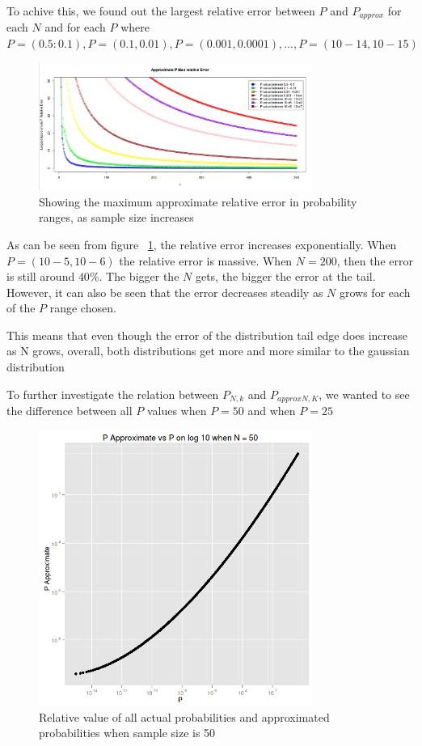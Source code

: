 \documentclass[12pt]{article}
\begin{document}
To achive this, we found out the largest relative error between $P$ and $P_{approx}$ for each $N$ and for each $P$ where $P = (0.5:0.1), P = (0.1, 0.01), P = (0.001, 0.0001), ... , P = (10-14 , 10-15)$

\begin{figure}
	\centering
  \includegraphics[width=0.8\textwidth]{LargestApproxPRelativeError3}
	\caption{Showing the maximum approximate relative error in probability ranges, as sample size increases}
	\label{fig:LargestApproxPRelativeError}
\end{figure}

As can be seen from figure ~\ref{fig:LargestApproxPRelativeError}, the relative error increases exponentially. When $P = (10-5 , 10-6)$ the relative error is massive. When $N=200$, then the error is still around $40\%$. The bigger the $N$ gets, the bigger the error at the tail. However, it can also be seen that the error decreases steadily as $N$ grows for each of the $P$ range chosen.

This means that even though the error of the distribution tail edge does increase as N grows, overall, both distributions get more and more similar to the gaussian distribution

To further investigate the relation between $P_{N, k}$ and $P_{approx N, K}$, we wanted to see the difference between all $P$ values when $P = 50$ and when $P = 25$

\begin{figure}
	\centering
  \includegraphics[width=0.8\textwidth]{PvsP50}
	\caption{Relative value of all actual probabilities and approximated probabilities when sample size is 50}
	\label{fig:PvsP50}
\end{figure}
\end{document}
